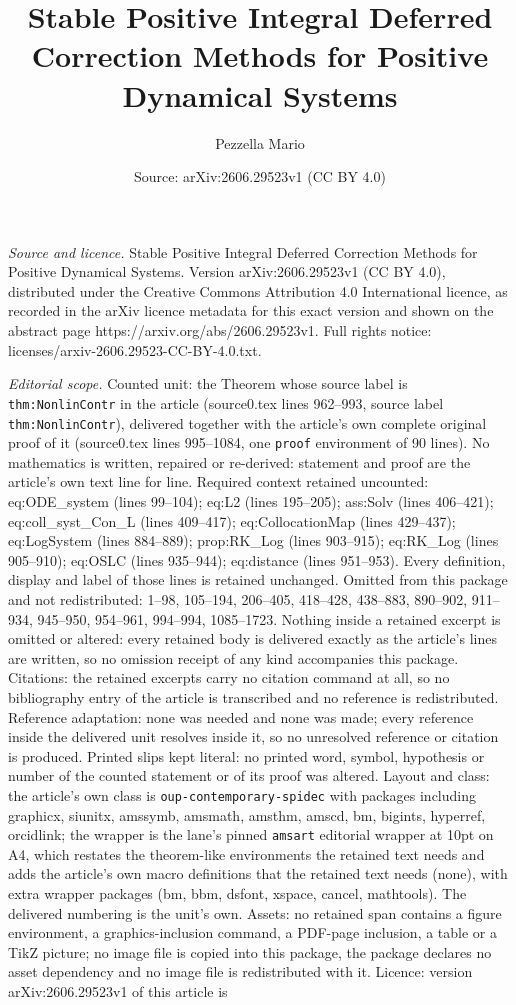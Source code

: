 \documentclass[10pt,a4paper]{amsart}
\title[Stable Positive Integral Deferred Correction Methods for Pos]{Stable Positive Integral Deferred Correction Methods for Positive Dynamical Systems}
\author{Pezzella Mario}
\date{Source: arXiv:2606.29523v1 (CC BY 4.0)}
\begin{document}
\maketitle

\noindent\emph{Source and licence.} Stable Positive Integral Deferred Correction Methods for Positive Dynamical Systems. Version arXiv:2606.29523v1 (CC BY 4.0), distributed under the Creative Commons Attribution 4.0 International licence, as recorded in the arXiv licence metadata for this exact version and shown on the abstract page https://arxiv.org/abs/2606.29523v1. Full rights notice: licenses/arxiv-2606.29523-CC-BY-4.0.txt.\par\smallskip

\noindent\textit{Editorial scope.} Counted unit: the Theorem whose source label is \texttt{thm:NonlinContr} in the article (source0.tex lines 962--993, source label \texttt{thm:NonlinContr}), delivered together with the article's own complete original proof of it (source0.tex lines 995--1084, one \texttt{proof} environment of 90 lines). No mathematics is written, repaired or re-derived: statement and proof are the article's own text line for line. Required context retained uncounted: eq:ODE\_system (lines 99--104); eq:L2 (lines 195--205); ass:Solv (lines 406--421); eq:coll\_syst\_Con\_L (lines 409--417); eq:CollocationMap (lines 429--437); eq:LogSystem (lines 884--889); prop:RK\_Log (lines 903--915); eq:RK\_Log (lines 905--910); eq:OSLC (lines 935--944); eq:distance (lines 951--953). Every definition, display and label of those lines is retained unchanged. Omitted from this package and not redistributed: 1--98, 105--194, 206--405, 418--428, 438--883, 890--902, 911--934, 945--950, 954--961, 994--994, 1085--1723. Nothing inside a retained excerpt is omitted or altered: every retained body is delivered exactly as the article's lines are written, so no omission receipt of any kind accompanies this package. Citations: the retained excerpts carry no citation command at all, so no bibliography entry of the article is transcribed and no reference is redistributed. Reference adaptation: none was needed and none was made; every reference inside the delivered unit resolves inside it, so no unresolved reference or citation is produced. Printed slips kept literal: no printed word, symbol, hypothesis or number of the counted statement or of its proof was altered. Layout and class: the article's own class is \texttt{oup-contemporary-spidec} with packages including graphicx, siunitx, amssymb, amsmath, amsthm, amscd, bm, bigints, hyperref, orcidlink; the wrapper is the lane's pinned \texttt{amsart} editorial wrapper at 10pt on A4, which restates the theorem-like environments the retained text needs and adds the article's own macro definitions that the retained text needs (none), with extra wrapper packages (bm, bbm, dsfont, xspace, cancel, mathtools). The delivered numbering is the unit's own. Assets: no retained span contains a figure environment, a graphics-inclusion command, a PDF-page inclusion, a table or a TikZ picture; no image file is copied into this package, the package declares no asset dependency and no image file is redistributed with it. Licence: version arXiv:2606.29523v1 of this article is 
\end{document}
